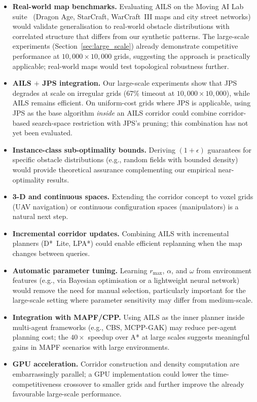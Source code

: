 \documentclass[journal]{IEEEtran}
\begin{document}
\begin{itemize}
    \item \textbf{Real-world map benchmarks.}  Evaluating AILS on the Moving AI Lab suite~\cite{sturtevant2012benchmarks} (Dragon Age, StarCraft, WarCraft~III maps and city street networks) would validate generalisation to real-world obstacle distributions with correlated structure that differs from our synthetic patterns.
    The large-scale experiments (Section~\ref{sec:large_scale}) already demonstrate competitive performance at $10{,}000{\times}10{,}000$ grids, suggesting the approach is practically applicable; real-world maps would test topological robustness further.
    \item \textbf{AILS $+$ JPS integration.}  Our large-scale experiments show that JPS degrades at scale on irregular grids (67\% timeout at $10{,}000{\times}10{,}000$), while AILS remains efficient.
    On uniform-cost grids where JPS is applicable, using JPS as the base algorithm \emph{inside} an AILS corridor could combine corridor-based search-space restriction with JPS's pruning; this combination has not yet been evaluated.
    \item \textbf{Instance-class sub-optimality bounds.}  Deriving $(1{+}\epsilon)$ guarantees for specific obstacle distributions (e.g., random fields with bounded density) would provide theoretical assurance complementing our empirical near-optimality results.
    \item \textbf{3-D and continuous spaces.}  Extending the corridor concept to voxel grids (UAV navigation) or continuous configuration spaces (manipulators) is a natural next step.
    \item \textbf{Incremental corridor updates.}  Combining AILS with incremental planners (D*~Lite, LPA*) could enable efficient replanning when the map changes between queries.
    \item \textbf{Automatic parameter tuning.}  Learning $r_{\max}$, $\alpha$, and $\omega$ from environment features (e.g., via Bayesian optimisation or a lightweight neural network) would remove the need for manual selection, particularly important for the large-scale setting where parameter sensitivity may differ from medium-scale.
    \item \textbf{Integration with MAPF/CPP.}  Using AILS as the inner planner inside multi-agent frameworks (e.g., CBS, MCPP-GAK) may reduce per-agent planning cost; the $40{\times}$ speedup over A* at large scales suggests meaningful gains in MAPF scenarios with large environments.
    \item \textbf{GPU acceleration.}  Corridor construction and density computation are embarrassingly parallel; a GPU implementation could lower the time-competitiveness crossover to smaller grids and further improve the already favourable large-scale performance.
\end{itemize}
\end{document}
